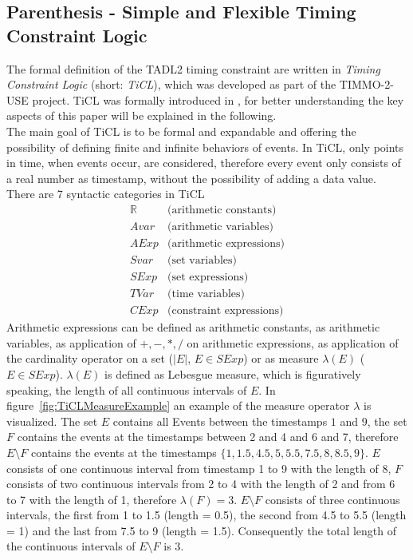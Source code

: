 \subsection{Parenthesis - Simple and Flexible Timing Constraint Logic}
	The formal definition of the TADL2 timing constraint are written in \emph{Timing Constraint Logic} (short: \emph{TiCL}), which was developed as part of the TIMMO-2-USE project. TiCL was formally introduced in \cite{TiCL}, for better understanding the key aspects of this paper will be explained in the following.\\
	The main goal of TiCL is to be formal and expandable and offering the possibility of defining finite and infinite behaviors of events. In TiCL, only points in time, when events occur, are considered, therefore every event only consists of a real number as timestamp, without the possibility of adding a data value. There are 7 syntactic categories in TiCL
	\begin{align*}
		\mathbb{R} &\text{(arithmetic constants)}\\
		Avar &\text{(arithmetic variables)}\\
		AExp &\text{(arithmetic expressions)}\\[10pt]
		Svar &\text{(set variables)}\\
		SExp &\text{(set expressions)}\\[10pt]
		TVar &\text{(time variables)}\\
		CExp &\text{(constraint expressions)}
	\end{align*}
	Arithmetic expressions can be defined as arithmetic constants, as arithmetic variables, as application of $+,-,*,/$ on arithmetic expressions, as application of the cardinality operator on a set ($|E|$, $E\in SExp$) or as measure $\lambda(E)$ ($E\in SExp$). $\lambda(E)$ is defined as Lebesgue measure, which is figuratively speaking, the length of all continuous intervals of $E$. In figure~\ref{fig:TiCLMeasureExample} an example of the measure operator $\lambda$ is visualized. The set $E$ contains all Events between the timestamps $1$ and $9$, the set $F$ contains the events at the timestamps between 2 and 4 and 6 and 7, therefore $E\setminus F$ contains the events at the timestamps $\{1, 1.5, 4.5, 5, 5.5, 7.5, 8, 8.5, 9\}$.
	$E$ consists of one continuous interval from timestamp 1 to 9 with the length of 8, $F$ consists of two continuous intervals from 2 to 4 with the length of 2 and from 6 to 7 with the length of 1, therefore $\lambda(F)=3$. $E\setminus F$ consists of three continuous intervals, the first from 1 to 1.5 (length = 0.5), the second from 4.5 to 5.5 (length = 1) and the last from 7.5 to 9 (length = 1.5). Consequently the total length of the continuous intervals of $E\setminus F$ is 3.\\
